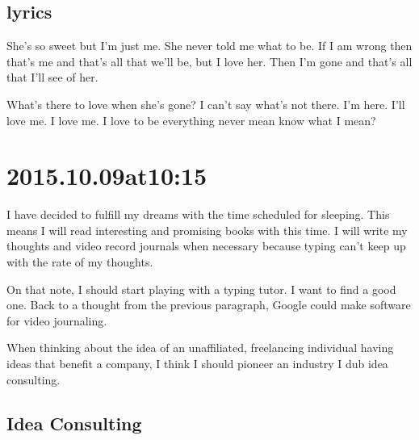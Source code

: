 \subsection*{lyrics}
She's so sweet but I'm just me.
She never told me what to be.
If I am wrong then that's me and that's all that we'll be, but I love her.
Then I'm gone and that's all that I'll see of her.

What's there to love when she's gone?
I can't say what's not there.
I'm here.
I'll love me.
I love me.
I love to be
everything
never mean
know what I mean?

\section*{2015.10.09at10:15}I have decided to fulfill my dreams with the time scheduled for sleeping. This means I will read interesting and promising books with this time. I will write my thoughts and video record journals when necessary because typing can't keep up with the rate of my thoughts.

On that note, I should start playing with a typing tutor. I want to find a good one. Back to a thought from the previous paragraph, Google could make software for video journaling.

When thinking about the idea of an unaffiliated, freelancing individual having ideas that benefit a company, I think I should pioneer an industry I dub idea consulting.

\subsection*{Idea Consulting}
